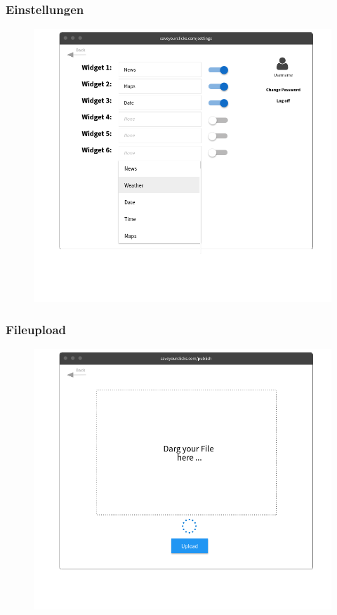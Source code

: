 		\subsubsection{Einstellungen}
			\begin{figure}[H]
				\includegraphics[scale=0.5]{images/p3}
			\end{figure}
		
		\subsubsection{Fileupload}
			\begin{figure}[H]
				\includegraphics[scale=0.5]{images/p4}
			\end{figure}
		
